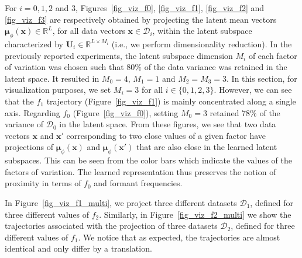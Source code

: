 \documentclass[review]{elsarticle}
\begin{document}
For $i = 0, 1, 2$ and $3$, Figures~\ref{fig_viz_f0}, \ref{fig_viz_f1}, \ref{fig_viz_f2} and \ref{fig_viz_f3} are respectively obtained by projecting the latent mean vectors $\boldsymbol{\mu}_\phi(\mathbf{x}) \in \mathbb{R}^L$, for all data vectors $\mathbf{x} \in \mathcal{D}_i$, within the latent subspace characterized by $\mathbf{U}_i \in \mathbb{R}^{L \times M_i}$ (i.e., we perform dimensionality reduction). In the previously reported experiments, the latent subspace dimension $M_i$ of each factor of variation was chosen such that $80\%$ of the data variance was retained in the latent space. It resulted in $M_0 = 4$, $M_1 = 1$ and $M_2 = M_3 = 3$. In this section, for visualization purposes, we set $M_i = 3$ for all $i \in \{0,1,2,3\}$. However, we can see that the $f_1$ trajectory (Figure~\ref{fig_viz_f1}) is mainly concentrated along a single axis. Regarding $f_0$ (Figure~\ref{fig_viz_f0}), setting $M_0 = 3$ retained 78$\%$ of the variance of $\mathcal{D}_0$ in the latent space. From these figures, we see that two data vectors $\mathbf{x}$ and $\mathbf{x}'$ corresponding to two close values of a given factor have projections of $\boldsymbol{\mu}_\phi(\mathbf{x})$ and $\boldsymbol{\mu}_\phi(\mathbf{x}')$ that are also close in the learned latent subspaces. This can be seen from the color bars which indicate the values of the factors of variation. The learned representation thus preserves the notion of proximity in terms of $f_0$ and formant frequencies.

In Figure~\ref{fig_viz_f1_multi}, we project three different datasets $\mathcal{D}_1$, defined for three different values of $f_2$. Similarly, in Figure~\ref{fig_viz_f2_multi} we show the trajectories associated with the projection of three datasets $\mathcal{D}_2$, defined for three different values of $f_1$. We notice that as expected, the trajectories are almost identical and only differ by a translation. 
\end{document}
